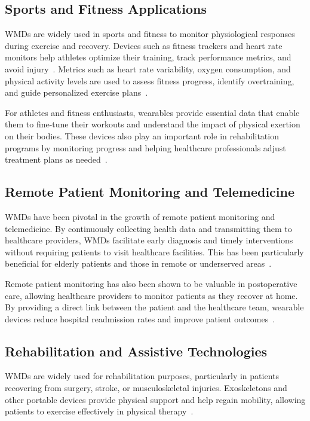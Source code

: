 \documentclass[journal]{IEEEtran}
\begin{document}
    \subsection{Sports and Fitness Applications}

    WMDs are widely used in sports and fitness to monitor physiological responses during exercise and recovery. Devices such as fitness trackers and heart rate monitors help athletes optimize their training, track performance metrics, and avoid injury~\cite{Iqbal2016}. Metrics such as heart rate variability, oxygen consumption, and physical activity levels are used to assess fitness progress, identify overtraining, and guide personalized exercise plans~\cite{Cusack2024}.

    For athletes and fitness enthusiasts, wearables provide essential data that enable them to fine-tune their workouts and understand the impact of physical exertion on their bodies. These devices also play an important role in rehabilitation programs by monitoring progress and helping healthcare professionals adjust treatment plans as needed~\cite{Cusack2024}.

    \subsection{Remote Patient Monitoring and Telemedicine}

    WMDs have been pivotal in the growth of remote patient monitoring and telemedicine. By continuously collecting health data and transmitting them to healthcare providers, WMDs facilitate early diagnosis and timely interventions without requiring patients to visit healthcare facilities. This has been particularly beneficial for elderly patients and those in remote or underserved areas~\cite{Dias2018, Nahavandi2022, Babu2024}.

    Remote patient monitoring has also been shown to be valuable in postoperative care, allowing healthcare providers to monitor patients as they recover at home. By providing a direct link between the patient and the healthcare team, wearable devices reduce hospital readmission rates and improve patient outcomes~\cite{Dias2018}.

    \subsection{Rehabilitation and Assistive Technologies}

    WMDs are widely used for rehabilitation purposes, particularly in patients recovering from surgery, stroke, or musculoskeletal injuries. Exoskeletons and other portable devices provide physical support and help regain mobility, allowing patients to exercise effectively in physical therapy~\cite{Dias2018 ,Hemapriya2017, Babu2024}.
\end{document}
